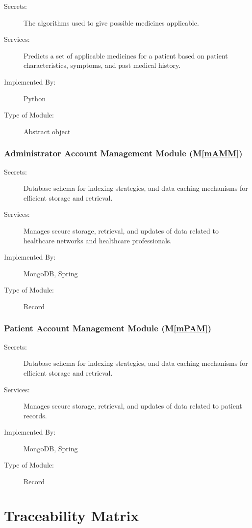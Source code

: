 \documentclass[12pt, titlepage]{article}
\newcommand{\mref}[1]{M\ref{#1}}
\begin{document}
\begin{description}
\item[Secrets:] The algorithms used to give possible medicines applicable.
\item[Services:] Predicts a set of applicable medicines for a patient based on patient characteristics, symptoms, and past medical history.
\item[Implemented By:] Python
\item[Type of Module:] Abstract object
\end{description}

\subsubsection{Administrator Account Management Module (\mref{mAMM})}

\begin{description}
\item[Secrets:]Database schema for indexing strategies, and data caching mechanisms for efficient storage and retrieval.
\item[Services:]Manages secure storage, retrieval, and updates of data related to healthcare networks and healthcare professionals.
\item[Implemented By:]MongoDB, Spring
\item[Type of Module:]Record
\end{description}

\subsubsection{Patient Account Management Module (\mref{mPAM})}

\begin{description}
\item[Secrets:]Database schema for indexing strategies, and data caching mechanisms for efficient storage and retrieval.
\item[Services:]Manages secure storage, retrieval, and updates of data related to patient records.
\item[Implemented By:]MongoDB, Spring
\item[Type of Module:]Record
\end{description}


\section{Traceability Matrix} \label{SecTM}
\end{document}
